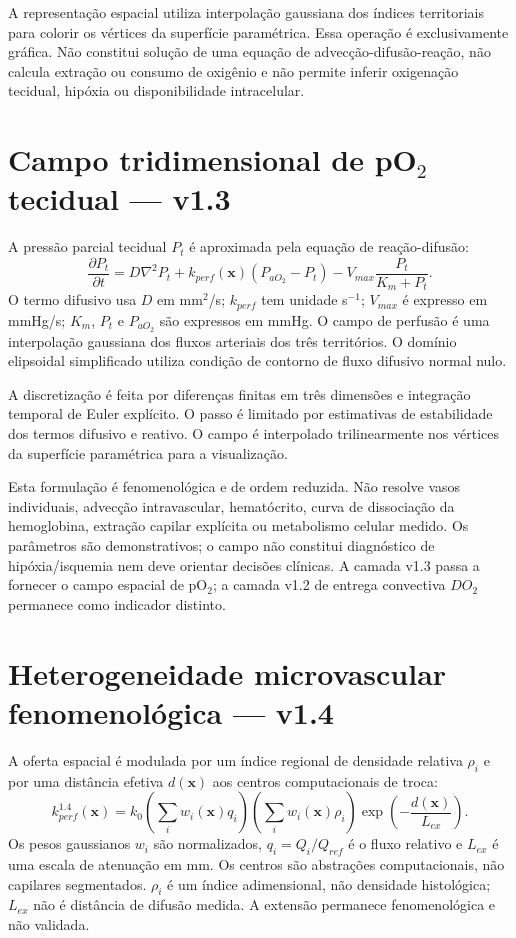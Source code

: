 \documentclass[11pt,a4paper]{article}
\begin{document}
A representação espacial utiliza interpolação gaussiana dos índices territoriais para colorir os vértices da superfície paramétrica. Essa operação é exclusivamente gráfica. Não constitui solução de uma equação de advecção-difusão-reação, não calcula extração ou consumo de oxigênio e não permite inferir oxigenação tecidual, hipóxia ou disponibilidade intracelular.


\section{Campo tridimensional de pO$_2$ tecidual — v1.3}
A pressão parcial tecidual $P_t$ é aproximada pela equação de reação-difusão:
\[
\frac{\partial P_t}{\partial t}
=D\nabla^2P_t+k_{perf}(\mathbf{x})(P_{aO_2}-P_t)
-V_{max}\frac{P_t}{K_m+P_t}.
\]
O termo difusivo usa $D$ em mm$^2$/s; $k_{perf}$ tem unidade s$^{-1}$; $V_{max}$ é expresso em mmHg/s; $K_m$, $P_t$ e $P_{aO_2}$ são expressos em mmHg. O campo de perfusão é uma interpolação gaussiana dos fluxos arteriais dos três territórios. O domínio elipsoidal simplificado utiliza condição de contorno de fluxo difusivo normal nulo.

A discretização é feita por diferenças finitas em três dimensões e integração temporal de Euler explícito. O passo é limitado por estimativas de estabilidade dos termos difusivo e reativo. O campo é interpolado trilinearmente nos vértices da superfície paramétrica para a visualização.

Esta formulação é fenomenológica e de ordem reduzida. Não resolve vasos individuais, advecção intravascular, hematócrito, curva de dissociação da hemoglobina, extração capilar explícita ou metabolismo celular medido. Os parâmetros são demonstrativos; o campo não constitui diagnóstico de hipóxia/isquemia nem deve orientar decisões clínicas. A camada v1.3 passa a fornecer o campo espacial de pO$_2$; a camada v1.2 de entrega convectiva $DO_2$ permanece como indicador distinto.

\section{Heterogeneidade microvascular fenomenológica — v1.4}
A oferta espacial é modulada por um índice regional de densidade relativa $\rho_i$ e por uma distância efetiva $d(\mathbf{x})$ aos centros computacionais de troca:
\[
k_{perf}^{1.4}(\mathbf{x})=k_0
\left(\sum_i w_i(\mathbf{x})q_i\right)
\left(\sum_i w_i(\mathbf{x})\rho_i\right)
\exp\left(-\frac{d(\mathbf{x})}{L_{ex}}\right).
\]
Os pesos gaussianos $w_i$ são normalizados, $q_i=Q_i/Q_{ref}$ é o fluxo relativo e $L_{ex}$ é uma escala de atenuação em mm. Os centros são abstrações computacionais, não capilares segmentados. $\rho_i$ é um índice adimensional, não densidade histológica; $L_{ex}$ não é distância de difusão medida. A extensão permanece fenomenológica e não validada.
\end{document}
